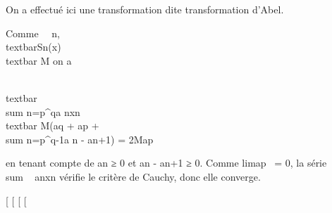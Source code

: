 On a effectué ici une transformation dite transformation d'Abel.

Comme \forall~~n,
\\textbar{}Sn(x)\\textbar{} \leq M
on a

\\textbar{}\\sum
n=p^qa
nxn\\textbar{} \leq
M(\textbar{}aq\textbar{} + \textbar{}ap\textbar{}
+ \\sum
n=p^q-1\textbar{}a n -
an+1\textbar{}) = 2Map

en tenant compte de an ≥ 0 et an - an+1 ≥
0. Comme limap~ = 0, la série
\\sum ~
anxn vérifie le critère de Cauchy, donc elle
converge.

{[}
{[}
{[}
{[}
